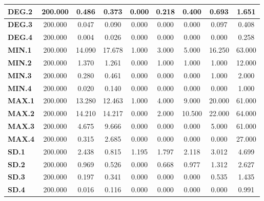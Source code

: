 \documentclass[
	article,			%
	11pt,				%
	oneside,			%
	a4paper,			%
	english,			%
	brazil,				%
	sumario=tradicional
	]{abntex2}
\begin{document}
\begin{table}[h!]
\begin{tabular}{l|c|c|c|c|c|c|c|c|}
\multicolumn{1}{|l|}{\textbf{DEG.2}}  & 200.000 & 0.486    & 0.373    & 0.000   & 0.218   & 0.400    & 0.693    & 1.651     \\ \hline
\multicolumn{1}{|l|}{\textbf{DEG.3}}  & 200.000 & 0.047    & 0.090    & 0.000   & 0.000   & 0.000    & 0.097    & 0.408     \\ \hline
\multicolumn{1}{|l|}{\textbf{DEG.4}}  & 200.000 & 0.004    & 0.026    & 0.000   & 0.000   & 0.000    & 0.000    & 0.258     \\ \hline
\multicolumn{1}{|l|}{\textbf{MIN.1}}  & 200.000 & 14.090   & 17.678   & 1.000   & 3.000   & 5.000    & 16.250   & 63.000    \\ \hline
\multicolumn{1}{|l|}{\textbf{MIN.2}}  & 200.000 & 1.370    & 1.261    & 0.000   & 1.000   & 1.000    & 1.000    & 12.000    \\ \hline
\multicolumn{1}{|l|}{\textbf{MIN.3}}  & 200.000 & 0.280    & 0.461    & 0.000   & 0.000   & 0.000    & 1.000    & 2.000     \\ \hline
\multicolumn{1}{|l|}{\textbf{MIN.4}}  & 200.000 & 0.020    & 0.140    & 0.000   & 0.000   & 0.000    & 0.000    & 1.000     \\ \hline
\multicolumn{1}{|l|}{\textbf{MAX.1}}  & 200.000 & 13.280   & 12.463   & 1.000   & 4.000   & 9.000    & 20.000   & 61.000    \\ \hline
\multicolumn{1}{|l|}{\textbf{MAX.2}}  & 200.000 & 14.210   & 14.217   & 0.000   & 2.000   & 10.500   & 22.000   & 64.000    \\ \hline
\multicolumn{1}{|l|}{\textbf{MAX.3}}  & 200.000 & 4.675    & 9.666    & 0.000   & 0.000   & 0.000    & 5.000    & 61.000    \\ \hline
\multicolumn{1}{|l|}{\textbf{MAX.4}}  & 200.000 & 0.315    & 2.685    & 0.000   & 0.000   & 0.000    & 0.000    & 27.000    \\ \hline
\multicolumn{1}{|l|}{\textbf{SD.1}}   & 200.000 & 2.438    & 0.815    & 1.195   & 1.797   & 2.118    & 3.012    & 4.699     \\ \hline
\multicolumn{1}{|l|}{\textbf{SD.2}}   & 200.000 & 0.969    & 0.526    & 0.000   & 0.668   & 0.977    & 1.312    & 2.627     \\ \hline
\multicolumn{1}{|l|}{\textbf{SD.3}}   & 200.000 & 0.197    & 0.341    & 0.000   & 0.000   & 0.000    & 0.535    & 1.435     \\ \hline
\multicolumn{1}{|l|}{\textbf{SD.4}}   & 200.000 & 0.016    & 0.116    & 0.000   & 0.000   & 0.000    & 0.000    & 0.991     \\ \hline

\end{tabular}
\end{table}
\end{document}
